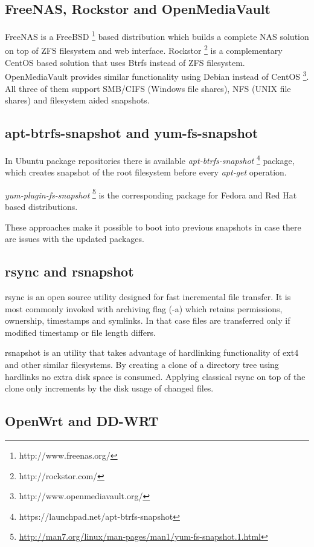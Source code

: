 \documentclass{article}
\begin{document}
\subsection{FreeNAS, Rockstor and OpenMediaVault}

FreeNAS is a FreeBSD \footnote{http://www.freenas.org/}
based distribution which builds a complete NAS solution on top of
ZFS filesystem and web interface.
Rockstor \footnote{http://rockstor.com/}
is a complementary CentOS based solution that uses Btrfs instead
of ZFS filesystem.
OpenMediaVault provides similar functionality using Debian instead of CentOS
\footnote{http://www.openmediavault.org/}.
All three of them support SMB/CIFS (Windows file shares),
NFS (UNIX file shares) and filesystem aided snapshots.


\subsection{apt-btrfs-snapshot and yum-fs-snapshot}

In Ubuntu package repositories there is available \emph{apt-btrfs-snapshot}
\footnote{https://launchpad.net/apt-btrfs-snapshot} package,
which creates snapshot of the root filesystem before every
\emph{apt-get} operation.

\emph{yum-plugin-fs-snapshot}
\footnote{\url{http://man7.org/linux/man-pages/man1/yum-fs-snapshot.1.html}}
is the corresponding package for Fedora and
Red Hat based distributions.

These approaches make it possible to boot into previous snapshots
in case there are issues with the updated packages.


\subsection{rsync and rsnapshot}

rsync is an open source utility designed for fast incremental file transfer.
It is most commonly invoked with archiving flag (-a) which retains permissions, ownership, timestamps and symlinks. In that case files are transferred only if
modified timestamp or file length differs.

rsnapshot is an utility that takes advantage of hardlinking functionality of ext4 and other similar filesystems. By creating a clone of a directory tree using hardlinks no extra disk space is consumed. Applying classical rsync on top of the clone only increments by the disk usage of changed files.


\subsection{OpenWrt and DD-WRT}
\end{document}

